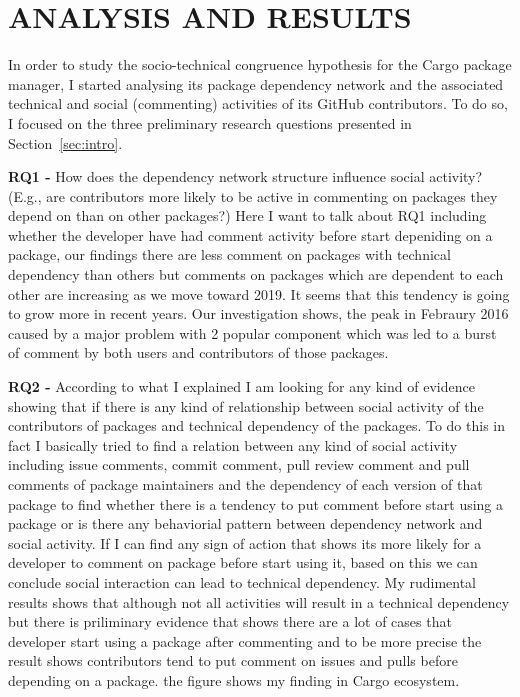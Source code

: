 \section{ANALYSIS AND RESULTS}

In order to study the socio-technical congruence hypothesis for the Cargo package manager, I started analysing its package dependency network and the associated technical and social (commenting) activities of its GitHub contributors.
To do so, I focused on the three preliminary research questions presented in Section~\ref{sec:intro}.


\textbf{RQ1 - } How does the dependency network structure influence social activity? (E.g., are contributors more likely to be active in commenting on packages they depend on than on other packages?) Here I want to talk about RQ1 including whether the developer have had comment activity before start depeniding on a package, our findings there are less comment on packages with technical dependency than others but comments on packages which are dependent to each other are increasing as we move toward 2019. It seems that this tendency is going to grow more in recent years. Our investigation shows, the peak in Febraury 2016 caused by a major problem with 2 popular component which was led to a burst of comment by both users and contributors of those packages.

\textbf{RQ2 - } According to what I explained I am looking for any kind of evidence showing that if there is any kind of relationship between social activity of the contributors of packages and technical dependency of the packages. To do this in fact I basically tried to find a relation between any kind of social activity including issue comments, commit comment, pull review comment and pull comments of package maintainers and the dependency of each version of that package to find whether there is a tendency to put comment before start using a package or is there any behaviorial pattern between dependency network and social activity. If I can find any sign of action that shows its more likely for a developer to comment on package before start using it, based on this we can conclude social interaction can lead to technical dependency. My rudimental results shows that although not all activities will result in a technical dependency but there is priliminary evidence that shows there are a lot of cases that developer start using a package after commenting and to be more precise the result shows contributors tend to put comment on issues and pulls before depending on a package. the figure shows my finding in Cargo ecosystem.

